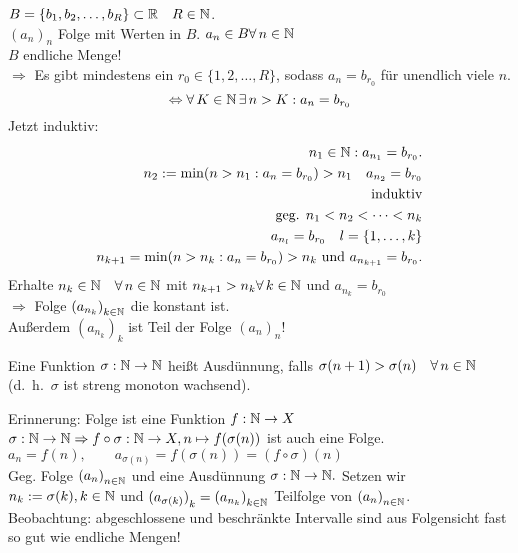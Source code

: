 \documentclass[../ana1.tex]{subfiles}
\begin{document}
\begin{bsp}
	\(B= \{b_1, b_2,\ldots,b_R \} \subset \mathbb{R} \quad R\in\mathbb{N} \).\\
	\( {(a_n)}_n \) Folge mit Werten in \(B\).
	\(a_n \in B \forall n\in\N \) \\
	\(B\) endliche Menge!\\
	\( \Rightarrow \) Es gibt mindestens ein \(r_0 \in \{1,2,\ldots,R\} \), sodass \( a_n=b_{r_0}  \) für unendlich viele \(n\).\\
	\[ \Leftrightarrow \forall K\in\N \,\exists n>K : a_n = b_{r_0} \]
	Jetzt induktiv: \\
	\begin{align*}
		n_1 \in\mathbb{N}: a_{n_1} = b_{r_0}.\\
		n_2 := \min (n>n_1:a_n=b_{r_0}) >n_1 \quad a_{n_2} = b_{r_0}\\
		\text{induktiv}\\
		\text{geg. } n_1 < n_2<\cdots<n_k\\
		a_{n_l} = b_{r_0} \quad l = \{1, \ldots,k \} \\
		n_{k+1} = \min(n>n_k:a_n = b_{r_0}) > n_k \text{ und } a_{n_{k+1}} = b_{r_0}.
	\end{align*}
	Erhalte \(n_k\in\N \quad \forall n\in\N \) mit \( n_{k+1} > n_k \forall k\in\N \) und \( a_{n_k} = b_{r_0} \) \\
	\( \Rightarrow \) Folge \( {(a_{n_k})}_{k\in\mathbb{N}} \) die konstant ist.\\
	Außerdem \( {(a_{n_k})}_k \) ist Teil der Folge \( {(a_n)}_n \)!
\end{bsp}
\begin{defi}[Teilfolge]
	Eine Funktion \( \sigma:\mathbb{N} \rightarrow\mathbb{N} \) heißt Ausdünnung, falls \( \sigma (n+1) > \sigma(n) \quad \forall n\in\N \) (d.\ h.\  \(\sigma \) ist streng monoton wachsend).
\end{defi}
Erinnerung: Folge ist eine Funktion \(f: \mathbb{N}\rightarrow X \) \\
\( \sigma : \mathbb{N}\rightarrow\mathbb{N} \Rightarrow f \circ \sigma : \mathbb{N}\rightarrow X, n\mapsto f(\sigma(n))  \) ist auch eine Folge.\\
\(a_n = f(n),\qquad a_{\sigma(n)} = f(\sigma(n)) = (f\circ\sigma)(n) \) \\
Geg. Folge \( {(a_n)}_{n\in\mathbb{N}} \) und eine Ausdünnung \( \sigma : \mathbb{N}\rightarrow \mathbb{N}. \) Setzen wir \( n_k := \sigma (k), k\in\mathbb{N} \) und \( {(a_{\sigma(k)})}_k = {(a_{n_k})}_{k\in\mathbb{N}} \) Teilfolge von \( {(a_n)}_{n\in\mathbb{N}} \).\\
Beobachtung: abgeschlossene und beschränkte Intervalle sind aus Folgensicht fast so gut wie endliche Mengen!
\end{document}
